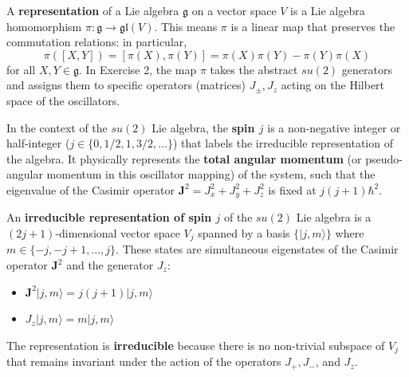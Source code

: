 \begin{solution}
\begin{definition}
A \textbf{representation} of a Lie algebra $\mathfrak{g}$ on a vector space $V$ is a Lie algebra homomorphism $\pi: \mathfrak{g} \to \mathfrak{gl}(V)$. This means $\pi$ is a linear map that preserves the commutation relations:
in particular,
\[ \pi([X, Y]) = [\pi(X), \pi(Y)] = \pi(X)\pi(Y) - \pi(Y)\pi(X) \]
for all $X, Y \in \mathfrak{g}$. In Exercise 2, the map $\pi$ takes the abstract $su(2)$ generators and assigns them to specific operators (matrices) $J_\pm, J_z$ acting on the Hilbert space of the oscillators.
\end{definition}

\begin{definition}
In the context of the $su(2)$ Lie algebra, the \textbf{spin $j$} is a non-negative integer or half-integer ($j \in \{0, 1/2, 1, 3/2, \dots\}$) that labels the irreducible representation of the algebra. It physically represents the \textbf{total angular momentum} (or pseudo-angular momentum in this oscillator mapping) of the system, such that the eigenvalue of the Casimir operator $\mathbf{J}^2 = J_x^2 + J_y^2 + J_z^2$ is fixed at $j(j+1)\hbar^2$.
\end{definition}

\begin{definition}
An \textbf{irreducible representation of spin $j$} of the $su(2)$ Lie algebra is a $(2j+1)$-dimensional vector space $V_j$ spanned by a basis $\{|j, m\rangle\}$ where $m \in \{-j, -j+1, \dots, j\}$. These states are simultaneous eigenstates of the Casimir operator $\mathbf{J}^2$ and the generator $J_z$:
\begin{itemize}
    \item $\mathbf{J}^2 |j, m\rangle = j(j+1) |j, m\rangle$
    \item $J_z |j, m\rangle = m |j, m\rangle$
\end{itemize}
The representation is \textbf{irreducible} because there is no non-trivial subspace of $V_j$ that remains invariant under the action of the operators $J_+, J_-$, and $J_z$.
\end{definition}


\end{solution}
